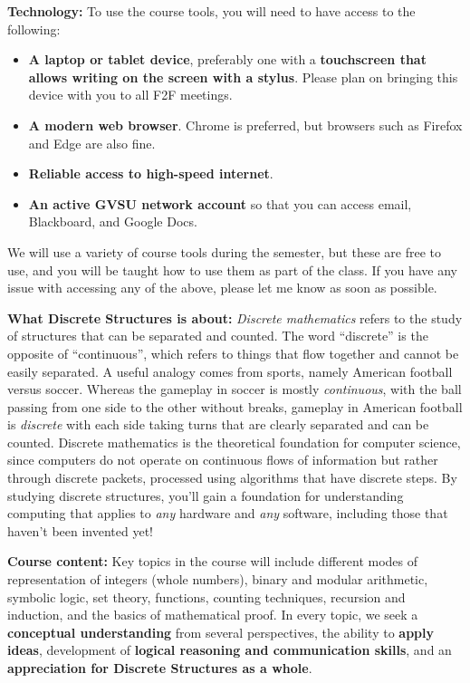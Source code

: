 \documentclass[]{article}
\providecommand{\tightlist}{%
  \setlength{\itemsep}{0pt}\setlength{\parskip}{0pt}}
\begin{document}
\textbf{Technology:} To use the course tools, you will need to have
access to the following:

\begin{itemize}
\tightlist
\item
  \textbf{A laptop or tablet device}, preferably one with a
  \textbf{touchscreen that allows writing on the screen with a stylus}.
  Please plan on bringing this device with you to all F2F meetings.
\item
  \textbf{A modern web browser}. Chrome is preferred, but browsers such
  as Firefox and Edge are also fine.
\item
  \textbf{Reliable access to high-speed internet}.
\item
  \textbf{An active GVSU network account} so that you can access email,
  Blackboard, and Google Docs.
\end{itemize}

We will use a variety of course tools during the semester, but these are
free to use, and you will be taught how to use them as part of the
class. If you have any issue with accessing any of the above, please let
me know as soon as possible.

\textbf{What Discrete Structures is about:} \emph{Discrete mathematics}
refers to the study of structures that can be separated and counted. The
word ``discrete'' is the opposite of ``continuous'', which refers to
things that flow together and cannot be easily separated. A useful
analogy comes from sports, namely American football versus soccer.
Whereas the gameplay in soccer is mostly \emph{continuous}, with the
ball passing from one side to the other without breaks, gameplay in
American football is \emph{discrete} with each side taking turns that
are clearly separated and can be counted. Discrete mathematics is the
theoretical foundation for computer science, since computers do not
operate on continuous flows of information but rather through discrete
packets, processed using algorithms that have discrete steps. By
studying discrete structures, you'll gain a foundation for understanding
computing that applies to \emph{any} hardware and \emph{any} software,
including those that haven't been invented yet!

\textbf{Course content:} Key topics in the course will include different
modes of representation of integers (whole numbers), binary and modular
arithmetic, symbolic logic, set theory, functions, counting techniques,
recursion and induction, and the basics of mathematical proof. In every
topic, we seek a \textbf{conceptual understanding} from several
perspectives, the ability to \textbf{apply ideas}, development of
\textbf{logical reasoning and communication skills}, and an
\textbf{appreciation for Discrete Structures as a whole}.
\end{document}
